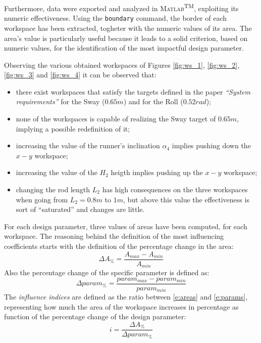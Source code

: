 \documentclass[10.5pt, twocolumn]{article}
\newcommand{\Virgolette}[1]{``#1''}
\begin{document}
Furthermore, data were exported and analyzed in \textsc{Matlab}\textsuperscript{TM}, exploiting its numeric effectiveness. Using the \texttt{boundary} command, the border of each workspace has been extracted, togheter with the numeric values of its area. The area's value is particularly useful because it leads to a solid criterion, based on numeric values, for the identification of the most impactful design parameter.

Observing the various obtained workspaces of Figures \ref{fig:ws_1}, \ref{fig:ws_2}, \ref{fig:ws_3} and \ref{fig:ws_4} it can be observed that:
\begin{itemize}
	\item there exist workspaces that satisfy the targets defined in the paper \textit{\Virgolette{System requirements}} for the Sway (\(0.65 m\)) and for the Roll (\(0.52 rad\));
	\item none of the workspaces is capable of realizing the Sway target of \(0.65 m\), implying a possible redefinition of it;   
	\item increasing the value of the runner's inclination \(\alpha_4\) implies pushing down the \(x-y\) workspace;
	\item increasing the value of the \(H_2\) heigth implies pushing up the \(x-y\) workspace;
	\item changing the rod length \(L_2\) has high consequences on the three workspaces when going from \(L_2=0.8 m\) to \(1m\), but above this value the effectiveness is sort of \Virgolette{saturated} and changes are little.
\end{itemize}

For each design parameter, three values of areas have been computed, for each workspace. The reasoning behind the definition of the most influencing coefficients starts with the definition of the percentage change in the area:
\begin{equation}
  \label{e:areas}
  \Delta A_{\%} = \frac{A_{max} - A_{min}}{A_{min}}
\end{equation}
Also the percentage change of the specific parameter is defined as:
 \begin{equation}
   \label{e:params}
   \Delta param_{\%} = \frac{param_{max} - param_{min}}{param_{min}}
 \end{equation}
The \textit{influence indices} are defined as the ratio between \eqref{e:areas} and \eqref{e:params}, representing how much the area of the workspace increases in percentage as function of the percentage change of the design parameter:
  \begin{equation}
    \label{e:indices}
    i = \frac{\Delta A_{\%}}{\Delta param_{\%}}
  \end{equation}
\end{document}
